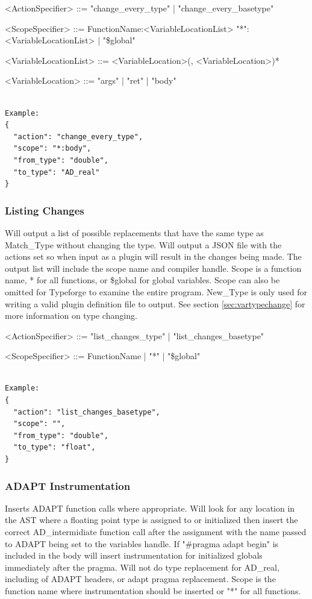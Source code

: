 \documentclass[natbib]{article}
\begin{document}
\begin{grammar}
<ActionSpecifier>  ::= "change_every_type" | "change_every_basetype"

<ScopeSpecifier>     ::=  FunctionName:<VariableLocationList> 
\alt "*":<VariableLocationList> | "\$global"

<VariableLocationList> ::= <VariableLocation>(, <VariableLocation>)*

<VariableLocation> ::= "args" | "ret" | "body"

\end{grammar}
\begin{verbatim}

Example:
{
  "action": "change_every_type",
  "scope": "*:body",
  "from_type": "double",
  "to_type": "AD_real"
}
\end{verbatim}

\subsubsection{Listing Changes} \label{sec:listChange}
Will output a list of possible replacements that have the same type as Match\_Type without changing the type. 
Will output a JSON file with the actions set so when input as a plugin will result in the changes being made. 
The output list will include the scope name and compiler handle. Scope is a function name, * for all functions, 
or \$global for global variables. Scope can also be omitted for Typeforge to examine the entire program. 
New\_Type is only used for writing a valid plugin definition file to output. 
See section \ref{sec:vartypechange} for more information on type changing. 

\begin{grammar}
<ActionSpecifier>  ::= "list_changes_type" | "list_changes_basetype"

<ScopeSpecifier> ::= FunctionName | "*" | "\$global"
\end{grammar}
\begin{verbatim}  

Example:
{
  "action": "list_changes_basetype",
  "scope": "",
  "from_type": "double",
  "to_type": "float",
}
\end{verbatim}

\subsubsection{ADAPT Instrumentation}
Inserts ADAPT function calls where appropriate. Will look for any location in the AST where a floating 
point type is assigned to or initialized then insert the correct AD\_intermidiate function 
call after the assignment with the name passed to ADAPT being set to the variables handle. 
If "\#pragma adapt begin" is included in the body will insert instrumentation for initialized 
globals immediately after the pragma. Will not do type replacement for AD\_real, including 
of ADAPT headers, or adapt pragma replacement. Scope is the function name where 
instrumentation should be inserted or "*" for all functions.
\end{document}
